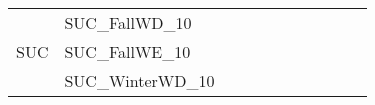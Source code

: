 \begin{table}[]
{\begin{tabular}{|c|l|ll|ll|ll|l|l|l|}
			\hline
			\multirow{8}{*}{SUC}   & SUC\_FallWD\_10               &                                   &                                  &                           &                          &                           &                          &                                       &        &                        \\
			& SUC\_FallWE\_10               &                                   &                                  &                           &                          &                           &                          &                                       &                               & \\
			& SUC\_WinterWD\_10             &                                   &                                  &                           &                          &                           &                          &                                       &                               & \\

\end{tabular}}
\end{table}
